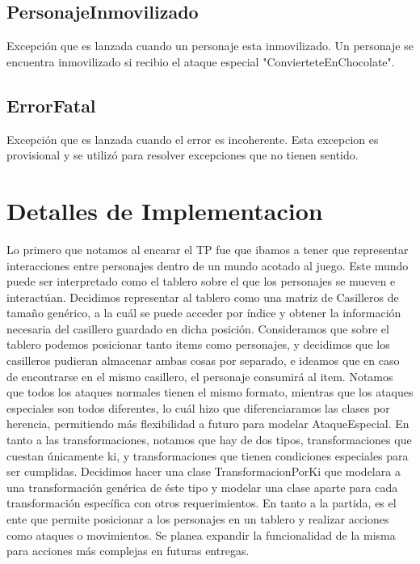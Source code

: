 \documentclass[a4paper]{article}
\begin{document}
\subsection{PersonajeInmovilizado}
Excepción que es lanzada cuando un personaje esta inmovilizado. Un personaje se encuentra inmovilizado si recibio el ataque especial "ConvierteteEnChocolate".

\subsection{ErrorFatal}
Excepción que es lanzada cuando el error es incoherente. Esta excepcion es provisional y se utilizó para resolver excepciones que no tienen sentido. 



\newpage
\section{Detalles de Implementacion}
Lo primero que notamos al encarar el TP fue que ibamos a tener que representar interacciones entre personajes dentro de un mundo acotado al juego. Este mundo puede ser interpretado como el tablero sobre el que los personajes se mueven e interactúan. 
Decidimos representar al tablero como una matriz de Casilleros de tamaño genérico, a la cuál se puede acceder por índice y obtener la información necesaria del casillero guardado en dicha posición.
Consideramos que sobre el tablero podemos posicionar tanto items como personajes, y decidimos que los casilleros pudieran almacenar ambas cosas por separado, e ideamos que en caso de encontrarse en el mismo casillero, el personaje consumirá al item.
Notamos que todos los ataques normales tienen el mismo formato, mientras que los ataques especiales son todos diferentes, lo cuál hizo que diferenciaramos las clases por herencia, permitiendo más flexibilidad a futuro para modelar AtaqueEspecial.
En tanto a las transformaciones, notamos que hay de dos tipos, transformaciones que cuestan únicamente ki, y transformaciones que tienen condiciones especiales para ser cumplidas. Decidimos hacer una clase TransformacionPorKi que modelara a una transformación genérica de éste tipo y modelar una clase aparte para cada transformación específica con otros requerimientos.
En tanto a la partida, es el ente que permite posicionar a los personajes en un tablero y realizar acciones como ataques o movimientos. Se planea expandir la funcionalidad de la misma para acciones más complejas en futuras entregas. 
\end{document}
